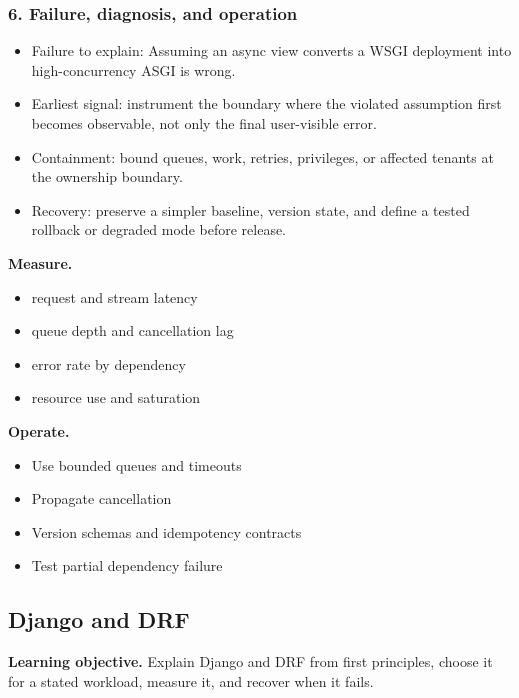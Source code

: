 \subsubsection*{6. Failure, diagnosis, and operation}
\begin{itemize}
\item Failure to explain: Assuming an async view converts a WSGI deployment into high-concurrency ASGI is wrong.
\item Earliest signal: instrument the boundary where the violated assumption first becomes observable, not only the final user-visible error.
\item Containment: bound queues, work, retries, privileges, or affected tenants at the ownership boundary.
\item Recovery: preserve a simpler baseline, version state, and define a tested rollback or degraded mode before release.
\end{itemize}
\textbf{Measure.}\begin{itemize}
\item request and stream latency
\item queue depth and cancellation lag
\item error rate by dependency
\item resource use and saturation
\end{itemize}
\textbf{Operate.}\begin{itemize}
\item Use bounded queues and timeouts
\item Propagate cancellation
\item Version schemas and idempotency contracts
\item Test partial dependency failure
\end{itemize}
\subsection{Django and DRF}
\textbf{Learning objective.} Explain Django and DRF from first principles, choose it for a stated workload, measure it, and recover when it fails.
